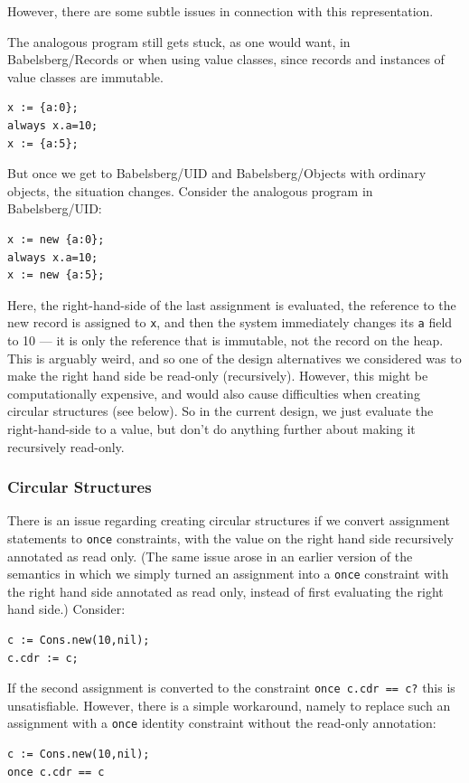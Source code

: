 \documentclass{article}
\begin{document}
However, there are some subtle issues in connection with this representation.

The analogous program still gets stuck, as one would want, in
Babelsberg/Records or when using value classes, since records and
instances of value classes are immutable.

\begin{verbatim}
x := {a:0};
always x.a=10;
x := {a:5};
\end{verbatim}


But once we get to Babelsberg/UID and Babelsberg/Objects with ordinary
objects, the situation changes.  Consider the analogous program in
Babelsberg/UID:
\begin{verbatim}
x := new {a:0};
always x.a=10;
x := new {a:5};
\end{verbatim}

Here, the right-hand-side of the last assignment is evaluated, the
reference to the new record is assigned to \verb|x|, and then the
system immediately changes its \verb|a| field to 10 --- it is only the
reference that is immutable, not the record on the heap.  This is
arguably weird, and so one of the design alternatives we considered
was to make the right hand side be read-only (recursively).  However,
this might be computationally expensive, and would also cause
difficulties when creating circular structures (see below).  So in the
current design, we just evaluate the right-hand-side to a value, but
don't do anything further about making it recursively read-only.

\subsubsection{Circular Structures}
\label{sec:circular-structures}

There is an issue regarding creating circular structures if we convert
assignment statements to \verb|once| constraints, with the value on
the right hand side recursively annotated as read only.  (The same
issue arose in an earlier version of the semantics in which we simply
turned an assignment into a \verb|once| constraint with the right hand
side annotated as read only, instead of first evaluating the right
hand side.)  Consider:
\begin{verbatim}
c := Cons.new(10,nil);
c.cdr := c;
\end{verbatim}

If the second assignment is converted to the constraint
\verb|once c.cdr == c?| this is unsatisfiable.  However, there is a
simple workaround, namely to replace such an assignment with a
\verb|once| identity constraint without the read-only annotation:
\begin{verbatim}
c := Cons.new(10,nil);
once c.cdr == c
\end{verbatim}
\end{document}

